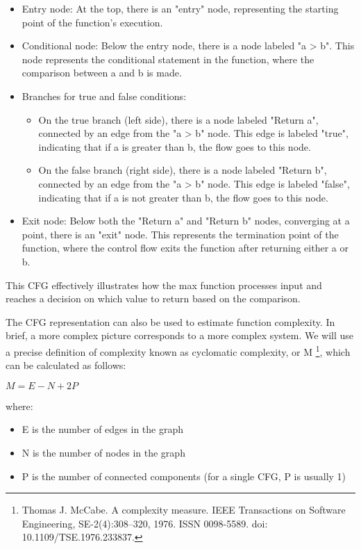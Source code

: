 \begin{itemize}
\item
Entry node: At the top, there is an "entry" node, representing the starting point of the function's execution.

\item
Conditional node: Below the entry node, there is a node labeled "a > b". This node represents the conditional statement in the function, where the comparison between a and b is made.

\item
Branches for true and false conditions:
\begin{itemize}
\item
On the true branch (left side), there is a node labeled "Return a", connected by an edge from the "a > b" node. This edge is labeled "true", indicating that if a is greater than b, the flow goes to this node.

\item
On the false branch (right side), there is a node labeled "Return b", connected by an edge from the "a > b" node. This edge is labeled "false", indicating that if a is not greater than b, the flow goes to this node.
\end{itemize}

\item
Exit node: Below both the "Return a" and "Return b" nodes, converging at a point, there is an "exit" node. This represents the termination point of the function, where the control flow exits the function after returning either a or b.
\end{itemize}

This CFG effectively illustrates how the max function processes input and reaches a decision on which value to return based on the comparison.

The CFG representation can also be used to estimate function complexity. In brief, a more complex picture corresponds to a more complex system. We will use a precise definition of complexity known as cyclomatic complexity, or M \footnote{Thomas J. McCabe. A complexity measure. IEEE Transactions on Software Engineering, SE-2(4):308–320, 1976. ISSN 0098-5589. doi: 10.1109/TSE.1976.233837.}, which can be calculated as follows:

$M = E - N + 2P$

where:

\begin{itemize}
\item
E is the number of edges in the graph

\item
N is the number of nodes in the graph

\item
P is the number of connected components (for a single CFG, P is usually 1)
\end{itemize}

